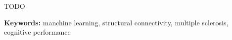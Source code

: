 TODO

\vspace*{1cm}

\textbf{Keywords:} manchine learning, structural connectivity, multiple sclerosis, cognitive performance